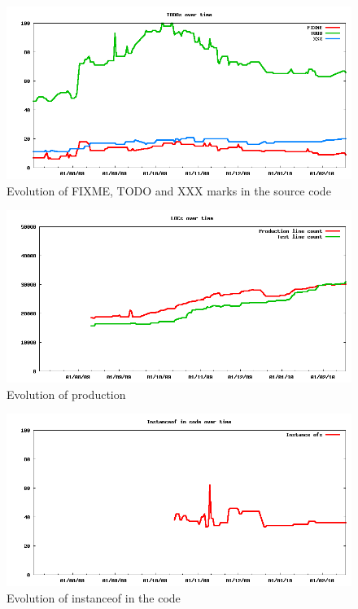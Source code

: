 \documentclass[lnbip]{svmultln}
\begin{document}
\begin{figure}[hbt]
  \centerline{
    \includegraphics[width=120mm]{TODOs.png}
  }
  \caption{Evolution of FIXME, TODO and XXX marks in the source code}
  \label{fig:TODOs}
\end{figure}

\begin{figure}[hbt]
  \centerline{
    \includegraphics[width=120mm]{LOCs.png}
  }
  \caption{Evolution of production }
  \label{fig:LOCs}
\end{figure}

\begin{figure}[hbt]
  \centerline{
    \includegraphics[width=120mm]{InstanceOfs.png}
  }
  \caption{Evolution of instanceof in the code }
  \label{fig:InstanceOfs}
\end{figure}
\end{document}

